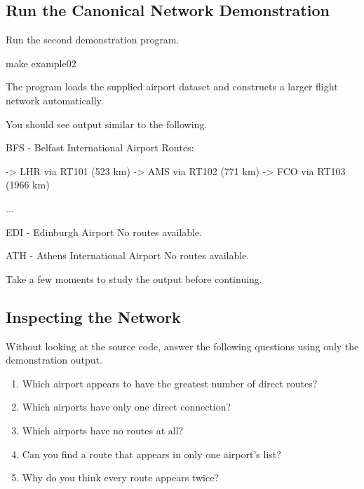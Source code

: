 \documentclass{csc2059practical}
\begin{document}
\subsection{Run the Canonical Network Demonstration}

Run the second demonstration program.

\begin{terminal}
make example02
\end{terminal}

The program loads the supplied airport dataset and constructs a larger flight
network automatically.

You should see output similar to the following.

\begin{terminal}
BFS - Belfast International Airport
Routes:

  -> LHR via RT101 (523 km)
  -> AMS via RT102 (771 km)
  -> FCO via RT103 (1966 km)

...

EDI - Edinburgh Airport
No routes available.

ATH - Athens International Airport
No routes available.
\end{terminal}

Take a few moments to study the output before continuing.


\subsection{Inspecting the Network}

Without looking at the source code, answer the following questions using only
the demonstration output.

\begin{reflectionbox}
\begin{enumerate}
    \item Which airport appears to have the greatest number of direct routes?
    \item Which airports have only one direct connection?
    \item Which airports have no routes at all?
    \item Can you find a route that appears in only one airport's list?
    \item Why do you think every route appears twice?
\end{enumerate}
\end{reflectionbox}
\end{document}
